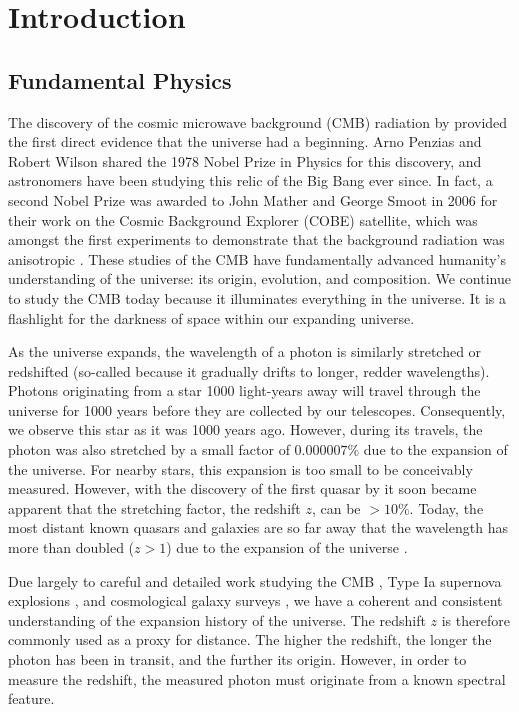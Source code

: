 \chapter{Introduction}

\begin{bibunit}

\section{Fundamental Physics}

The discovery of the cosmic microwave background (CMB) radiation by \citet{1965ApJ...142..419P}
provided the first direct evidence that the universe had a beginning. Arno Penzias and Robert Wilson
shared the 1978 Nobel Prize in Physics for this discovery, and astronomers have been studying this
relic of the Big Bang ever since. In fact, a second Nobel Prize was awarded to John Mather and
George Smoot in 2006 for their work on the Cosmic Background Explorer (COBE) satellite, which was
amongst the first experiments to demonstrate that the background radiation was anisotropic
\citep{1992ApJ...396L...1S}. These studies of the CMB have fundamentally advanced humanity's
understanding of the universe: its origin, evolution, and composition. We continue to study the CMB
today because it illuminates everything in the universe. It is a flashlight for the darkness of
space within our expanding universe.

As the universe expands, the wavelength of a photon is similarly stretched or redshifted (so-called
because it gradually drifts to longer, redder wavelengths). Photons originating from a star 1000
light-years away will travel through the universe for 1000 years before they are collected by our
telescopes. Consequently, we observe this star as it was 1000 years ago. However, during its
travels, the photon was also stretched by a small factor of $0.000007\%$ due to the expansion of the
universe.  For nearby stars, this expansion is too small to be conceivably measured.  However, with
the discovery of the first quasar by \citet{1963Natur.197.1040S} it soon became apparent that the
stretching factor, the redshift $z$, can be $>10\%$. Today, the most distant known quasars and
galaxies are so far away that the wavelength has more than doubled ($z > 1$) due to the expansion of
the universe \citep[e.g.,][]{2011Natur.474..616M, 2015ApJ...810L..12Z, 2016ApJ...819..129O,
2018Natur.553..473B}.

Due largely to careful and detailed work studying the CMB \citep[e.g.,][]{2013ApJS..208...19H,
2016A&A...594A..25P}, Type Ia supernova explosions \citep[e.g.,][]{1998AJ....116.1009R,
1999ApJ...517..565P}, and cosmological galaxy surveys \citep[e.g.,][]{2001MNRAS.328.1039C}, we have
a coherent and consistent understanding of the expansion history of the universe. The redshift $z$
is therefore commonly used as a proxy for distance. The higher the redshift, the longer the photon
has been in transit, and the further its origin. However, in order to measure the redshift, the
measured photon must originate from a known spectral feature.


\end{bibunit}
